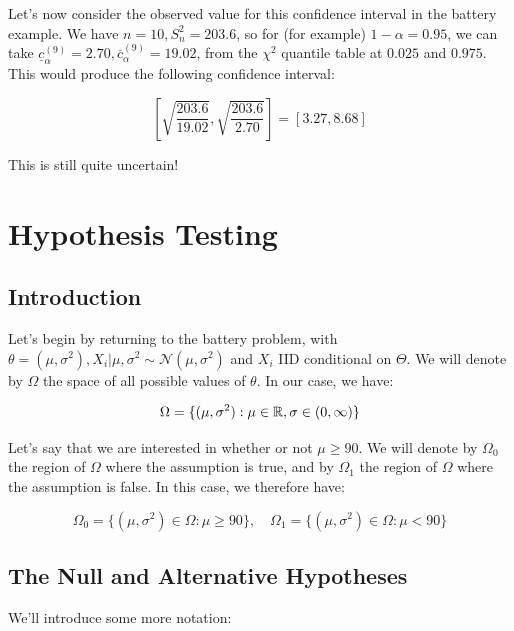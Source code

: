 \documentclass[a4paper]{article}
\begin{document}
            Let's now consider the observed value for this confidence interval
            in the battery example. We have $n = 10, S_n^2 = 203.6$, so for (for
            example) $1 - \alpha = 0.95$, we can take
            $\underline{c}_\alpha^{(9)} = 2.70, \overline{c}_\alpha^{(9)} =
            19.02$, from the $\chi^2$ quantile table at $0.025$ and $0.975$.
            This would produce the following confidence interval:

            \[
                \left[\sqrt{\frac{203.6}{19.02}}, \sqrt{\frac{203.6}{2.70}}
                \right] = [3.27, 8.68]
            \]

            This is still quite uncertain!

    \newpage
    \section{Hypothesis Testing}
        \subsection{Introduction}
            \begin{fread}
                [DS12, section 9.1]
            \end{fread}

            Let's begin by returning to the battery problem, with $\theta =
            (\mu, \sigma^2), X_i | \mu, \sigma^2 \sim \mathcal{N}(\mu,
            \sigma^2)$ and $X_i$ IID conditional on $\Theta$. We will denote by
            $\Omega$ the space of all possible values of $\theta$. In our case,
            we have:

            \[
                \Omega = \{(\mu, \sigma^2): \mu \in \mathbb{R}, \sigma \in (0, \infty)\}
            \]

            Let's say that we are interested in whether or not $\mu \geq 90$. We
            will denote by $\Omega_0$ the region of $\Omega$ where the
            assumption is true, and by $\Omega_1$ the region of $\Omega$ where
            the assumption is false. In this case, we therefore have:

            \[
                \Omega_0 = \{(\mu, \sigma^2) \in \Omega: \mu \geq 90\}, \quad
                \Omega_1 = \{(\mu, \sigma^2) \in \Omega: \mu < 90\}
            \]

        \subsection{The Null and Alternative Hypotheses}
            We'll introduce some more notation:
\end{document}
